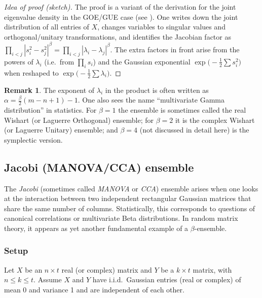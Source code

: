 \documentclass[letterpaper,11pt,oneside,reqno]{article}
\numberwithin{equation}{section}
\theoremstyle{definition}
\newtheorem{remark}[proposition]{Remark}
\begin{document}
\begin{proof}[Idea of proof (sketch)]
The proof is a variant of the derivation for the joint eigenvalue density in the GOE/GUE case (see ).  One writes down the joint distribution of all entries of \(X\), changes variables to singular values and orthogonal/unitary transformations, and identifies the Jacobian factor as
\(\prod_{i<j}|s_i^2 - s_j^2|^\beta = \prod_{i<j}| \lambda_i - \lambda_j |^\beta\).
The extra factors in front arise from the powers of \(\lambda_i\) (i.e.\ from \(\prod_i s_i\)) and the Gaussian exponential \(\exp\bigl(-\frac12\sum s_i^2\bigr)\) when reshaped to \(\exp\bigl(-\frac12\sum \lambda_i\bigr)\). 
\end{proof}
\begin{remark}
The exponent of \(\lambda_i\) in the product is often written as
\(\alpha = \frac{\beta}{2}(m-n+1)-1\).  One also sees the name ``multivariate Gamma distribution'' in statistics.  For \(\beta=1\) the ensemble is sometimes called the real Wishart (or Laguerre Orthogonal) ensemble; for \(\beta=2\) it is the complex Wishart (or Laguerre Unitary) ensemble; and \(\beta=4\) (not discussed in detail here) is the symplectic version.
\end{remark}


\subsection{Jacobi (MANOVA/CCA) ensemble}
\label{sec:Jacobi_MANOVA_CCA}

The \emph{Jacobi} (sometimes called \emph{MANOVA} or \emph{CCA}) ensemble arises when one looks at the interaction between two independent rectangular Gaussian matrices that share the same number of columns.  Statistically, this corresponds to questions of canonical correlations or multivariate Beta distributions.  In random matrix theory, it appears as yet another fundamental example of a \(\beta\)-ensemble.

\subsubsection{Setup}

Let \(X\) be an \(n\times t\) real (or complex) matrix and \(Y\) be a \(k\times t\) matrix, with \(n\le k \le t\).  Assume \(X\) and \(Y\) have i.i.d.\ Gaussian entries (real or complex) of mean 0 and variance 1 and are independent of each other.
\end{document}
